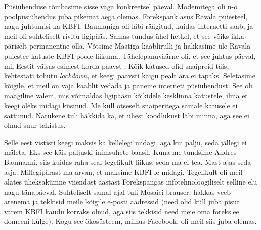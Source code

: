 
Püsiühenduse tõmbasime sisse väga konkreetsel päeval. 
Modemitega oli n-ö poolpüsiühendus juba pikemat aega olemas.  
Forekspank asus Rävala puiesteel, nagu 
juhtumisi ka KBFI. Baumaniga 
oli läbi räägitud, kuidas internetti saab, ja meil oli suhteliselt 
rivitu ligipääs. Samas tundus ühel hetkel, et see võiks ikka päriselt 
permanentne olla. Võtsime Mastiga kaablirulli ja 
hakkasime üle Rävala puiestee katuste KBFI poole liikuma. Tähelepanuväärne oli, 
et see juhtus päeval, mil Eestit väisas esimest korda paavst 
. 
Kõik katused olid snaipreid täis, kehtestati tohutu 
\emph{lockdown}, et keegi paavsti käigu pealt ära ei tapaks.  
Seletasime kõigile, et meil on vaja kaablit vedada ja paneme interneti 
püsiühendust. See oli maagiline valem, mis võimaldas ligipääsu 
kõikidele kesklinna katustele, ilma et keegi oleks midagi küsinud. Me küll 
otseselt snaiperitega samale katusele ei sattunud. Natukene tuli häkkida ka, 
et ühest koodlukust läbi minna, aga see ei olnud suur takistus. 


Selle eest vististi keegi maksis ka kellelegi midagi, aga kui palju, 
seda jällegi ei mäleta. Eks see käis paljuski inimsuhete baasil. 
Kuna me tundsime Andres Baumanni, siis kuidas raha
seal tegelikult liikus, seda ma ei tea. Mast ajas seda asja. 
Millegipärast ma arvan, et maksime KBFI-le midagi. 
Tegelikult oli meil alates
üheksakümne viiendast aastast
Forekspangas infotehnoloogiliselt selline elu nagu 
tänapäeval. 
Suhteliselt samal ajal tuli Mosaici brauser, hakkas veeb arenema ja 
tekkisid meile kõigile e-posti aadressid (need olid 
küll juba pisut varem KBFI kaudu korraks olnud, aga siis tekkisid need 
meie oma foreks.ee domeeni külge). Kogu see ökosüsteem, miinus Facebook, oli 
meil siis juba olemas. 

